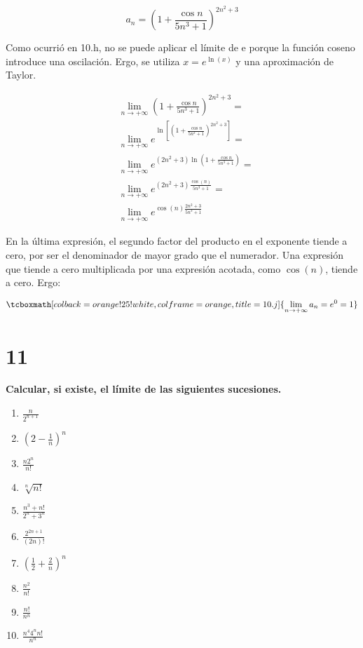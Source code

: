 \documentclass{article}
\newcommand{\hresult}[2]{\tcboxmath[colback=orange!25!white,colframe=orange, title=#1] {#2} }
\newcommand{\sectionx}[1]{\section*{#1}\label{sec:#1}\addcontentsline{toc}{section}{\nameref{sec:#1}}}
\newcommand{\limninf}{\lim_{n \rightarrow +\infty}}
\begin{document}
\begin{equation}
a_n = \left( 1 + \frac{\cos n}{5n^3 + 1} \right)^{2n^2 + 3}
\end{equation}

Como ocurrió en 10.h, no se puede aplicar el límite de e porque la función coseno introduce una oscilación. Ergo, se utiliza $ x = e^{\ln(x)} $ y una aproximación de Taylor.

\begin{subequations}
\begin{align}
& \limninf \left( 1 + \frac{\cos n}{5n^3 + 1} \right)^{2n^2 + 3} = \\
& \limninf e^{ \ln \left[ \left( 1 + \frac{\cos n}{5n^3 + 1} \right)^{2n^2 + 3} \right] } = \\
& \limninf e^{ (2n^2+3) \ln\left( 1 + \frac{\cos n}{5n^3 + 1} \right) } = \\
& \limninf e^{ (2n^2+3) \frac{\cos(n)}{5n^3+1} } = \\
& \limninf e^{ \cos(n) \frac{2n^2+3}{5n^3+1} }
\end{align}
\end{subequations}

En la última expresión, el segundo factor del producto en el exponente tiende a cero, por ser el denominador de mayor grado que el numerador. Una expresión que tiende a cero multiplicada por una expresión acotada, como $ \cos(n) $, tiende a cero. Ergo:

\begin{equation}
\hresult{10.j}{ \limninf a_n = e^0 = 1 }
\end{equation}

\sectionx{11}

\textbf{Calcular, si existe, el límite de las siguientes sucesiones.}

\begin{enumerate}[label=(\alph*)]

\bfseries

\item $ \frac{n}{2^{n+1}} $

\item $ \left( 2 - \frac{1}{n} \right)^n $

\item $ \frac{n 2^n}{n!} $

\item $ \sqrt[n]{n!} $

\item $ \frac{n^3 + n!}{2^n + 3^n} $

\item $ \frac{2^{2n+1}}{(2n)!} $

\item $ \left( \frac{1}{2} + \frac{2}{n} \right)^n $

\item $ \frac{n^2}{n!} $

\item $ \frac{n!}{n^n} $

\item $ \frac{n^4 4^n n!}{n^n} $

\end{enumerate}
\end{document}
